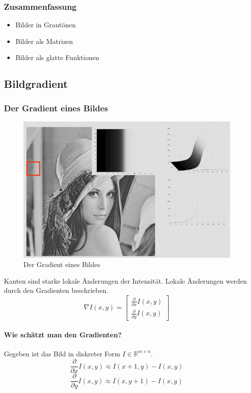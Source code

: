 \documentclass[12pt, a4paper, oneside]{article}
\begin{document}
\subsubsection*{Zusammenfassung}
\begin{itemize}
    \item Bilder in Grautönen
    \item Bilder als Matrizen
    \item Bilder als glatte Funktionen
\end{itemize}

\newpage

\subsection{Bildgradient}
\subsubsection{Der Gradient eines Bildes}
\begin{figure}[htbp]
    \centering
    \includegraphics{../img/1-5.png}
    \caption{Der Gradient eines Bildes}
    \label{img/1-5}
\end{figure}
Kanten sind starke lokale Änderungen der Intensität. Lokale Änderungen werden durch den Gradienten beschrieben.
$$
    \nabla I(x,y)=\begin{bmatrix}
    \frac{\partial}{\partial x}I(x,y) \\
    \frac{\partial}{\partial y}I(x,y)
    \end{bmatrix}
$$

\paragraph{Wie schätzt man den Gradienten?}
Gegeben ist das Bild in diskreter Form $I\in \mathbb R^{m\times n}$.
$$
    \frac{\partial}{\partial x} I(x,y)\approx I(x+1,y)-I(x,y)
$$
$$
    \frac{\partial}{\partial y}I(x,y)\approx I(x,y+1)-I(x,y)
$$
\end{document}
